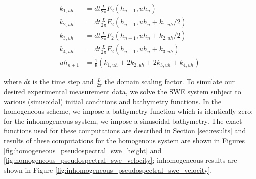 \begin{align*}
    k_{1,uh} &= dt\frac{L}{2\pi}F_2(h_{n+1}, uh_n)\\
    k_{2,uh} &= dt\frac{L}{2\pi}F_2(h_{n+1}, uh_n + k_{1,uh}/2)\\
    k_{3,uh} &= dt\frac{L}{2\pi}F_2(h_{n+1}, uh_n + k_{2,uh}/2)\\
    k_{4,uh} &= dt\frac{L}{2\pi}F_2(h_{n+1}, uh_n + k_{3,uh})\\
    uh_{n+1} &= \frac{1}{6}(k_{1,uh} + 2k_{2,uh} + 2k_{3,uh} + k_{4,uh})
\end{align*}

where $dt$ is the time step and $\frac{L}{2\pi}$ the domain scaling factor. To simulate our desired experimental 
measurement data, we solve the SWE system subject to various (sinusoidal) initial conditions and bathymetry functions. 
In the homogeneous scheme, we impose a bathymetry function which is identically zero; for the inhomogeneous system, we
impose a sinusoidal bathymetry. The exact functions used for these computations are described in Section 
\ref{sec:results} and results of these computations for the homogenous system are shown in Figures 
\ref{fig:homogeneous_pseudospectral_swe_height} and \ref{fig:homogeneous_pseudospectral_swe_velocity}; inhomogeneous 
results are shown in Figure \ref{fig:inhomogeneous_pseudospectral_swe_velocity}.